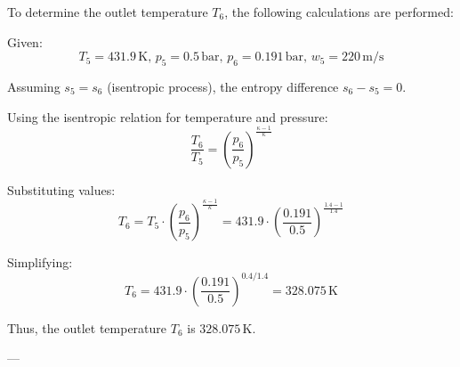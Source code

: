 To determine the outlet temperature \( T_6 \), the following calculations are performed:  

Given:  
\[
T_5 = 431.9 \, \text{K}, \, p_5 = 0.5 \, \text{bar}, \, p_6 = 0.191 \, \text{bar}, \, w_5 = 220 \, \text{m/s}
\]  

Assuming \( s_5 = s_6 \) (isentropic process), the entropy difference \( s_6 - s_5 = 0 \).  

Using the isentropic relation for temperature and pressure:  
\[
\frac{T_6}{T_5} = \left( \frac{p_6}{p_5} \right)^{\frac{\kappa - 1}{\kappa}}
\]  

Substituting values:  
\[
T_6 = T_5 \cdot \left( \frac{p_6}{p_5} \right)^{\frac{\kappa - 1}{\kappa}} = 431.9 \cdot \left( \frac{0.191}{0.5} \right)^{\frac{1.4 - 1}{1.4}}
\]  

Simplifying:  
\[
T_6 = 431.9 \cdot \left( \frac{0.191}{0.5} \right)^{0.4 / 1.4} = 328.075 \, \text{K}
\]  

Thus, the outlet temperature \( T_6 \) is \( 328.075 \, \text{K} \).  

---